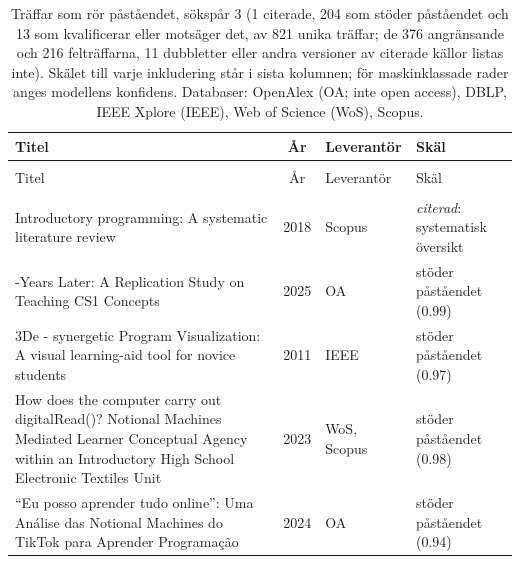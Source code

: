 
\begingroup\footnotesize
\begin{longtable}{@{}%
  >{\raggedright\arraybackslash}p{}c%
  >{\raggedright\arraybackslash}p{}%
  >{\raggedright\arraybackslash}p{}@{}}
\caption{Träffar som rör påståendet, sökspår 3 (1 citerade, 204 som stöder påståendet och 13 som kvalificerar eller motsäger det, av 821 unika träffar; de 376 angränsande och 216 felträffarna, 11 dubbletter eller andra versioner av citerade källor listas inte). Skälet till varje inkludering står i sista kolumnen; för maskinklassade rader anges modellens konfidens. Databaser: OpenAlex (OA; inte open access), DBLP, IEEE Xplore (IEEE), Web of Science (WoS), Scopus.}\label{tab:sok-B3}\\
\toprule
Titel & År & Leverantör & Skäl \\
\midrule
\endfirsthead
\multicolumn{4}{@{}l}{\emph{\tablename~\thetable{} (\GetTranslation{continued})}}\\
\toprule
Titel & År & Leverantör & Skäl \\
\midrule
\endhead
\midrule \multicolumn{4}{r@{}}{\emph{\GetTranslation{continued on the next page}}}\\
\endfoot
\bottomrule
\endlastfoot
Introductory programming: A systematic literature review & 2018 & Scopus & \emph{citerad}: systematisk översikt \\
20-Years Later: A Replication Study on Teaching CS1 Concepts & 2025 & OA & stöder påståendet (0.99) \\
3De - synergetic Program Visualization: A visual learning-aid tool for novice students & 2011 & IEEE & stöder påståendet (0.97) \\
\textquotedbl{}How does the computer carry out digitalRead()?\textquotedbl{} Notional Machines Mediated Learner Conceptual Agency within an Introductory High School Electronic Textiles Unit & 2023 & WoS, Scopus & stöder påståendet (0.98) \\
``Eu posso aprender tudo online'': Uma Análise das Notional Machines do TikTok para Aprender Programação & 2024 & OA & stöder påståendet (0.94) \\

\end{longtable}
